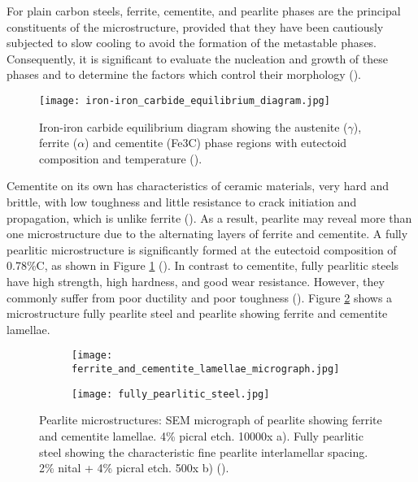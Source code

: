For plain carbon steels, ferrite, cementite, and pearlite phases are the principal constituents of the microstructure, provided that they have been cautiously subjected to slow cooling to avoid the formation of the metastable phases. Consequently, it is significant to evaluate the nucleation and growth of these phases and to determine the factors which control their morphology (\cite{bhadeshia2017steels}).

\begin{figure}[H]
    \centering
    \texttt{[image: iron-iron\_carbide\_equilibrium\_diagram.jpg]}
    \caption{Iron-iron carbide equilibrium diagram showing the austenite ($\gamma$), ferrite ($\alpha$) and cementite (Fe3C) phase regions with eutectoid composition and temperature (\cite{cmrp2014maintenance}).}
    \label{ch3:figure:equilibrium}
\end{figure}

Cementite on its own has characteristics of ceramic materials, very hard and brittle, with low toughness and little resistance to crack initiation and propagation, which is unlike ferrite (\cite{bajaj2020steels}). As a result, pearlite may reveal more than one microstructure due to the alternating layers of ferrite and cementite. A fully pearlitic microstructure is significantly formed at the eutectoid composition of 0.78\%C, as shown in Figure \ref{ch3:figure:equilibrium} (\cite{molabe2018determining}). In contrast to cementite, fully pearlitic steels have high strength, high hardness, and good wear resistance. However, they commonly suffer from poor ductility and poor toughness (\cite{molabe2018determining}). Figure \ref{ch3:figure:pearlite:microstructures} shows a microstructure fully pearlite steel and pearlite showing ferrite and cementite lamellae.

\begin{figure}[H]

\centering
\begin{subfigure}{.45\textwidth}
    \centering
    \texttt{[image: ferrite\_and\_cementite\_lamellae\_micrograph.jpg]}
    \caption{}
\end{subfigure}
\begin{subfigure}{.45\textwidth}
    \centering
    \texttt{[image: fully\_pearlitic\_steel.jpg]}
    \caption{}
\end{subfigure}

\caption{Pearlite microstructures:  SEM micrograph of pearlite showing ferrite and cementite lamellae. 4\% picral etch. 10000x a). Fully pearlitic steel showing the characteristic fine pearlite interlamellar spacing. 2\% nital + 4\% picral etch. 500x b) (\cite{molabe2018determining}).}
\label{ch3:figure:pearlite:microstructures}
\end{figure}

